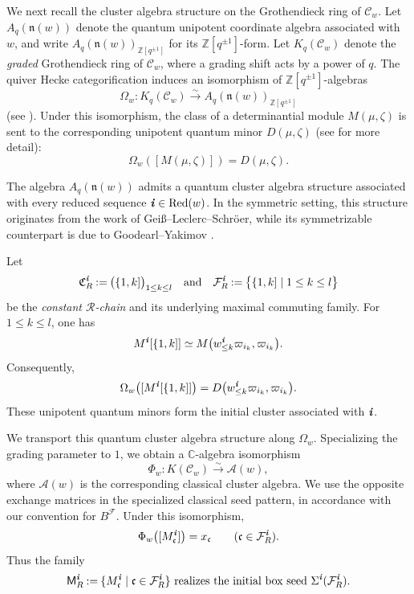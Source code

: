 \documentclass[12pt, leqno]{amsart}
\numberwithin{equation}{section}
\theoremstyle{plain}
\theoremstyle{definition}
\newcommand{\seteq}{\mathbin{:=}}
\newcommand{\C}{\mathbb{C}}
\newcommand{\ii}{ \textbf{\textit{i}}}
\newcommand{\frakC}{\mathfrak{C}}
\newcommand{\frakc}{\mathfrak{c}}
\newcommand{\sfM}{\mathsf{M}}
\newcommand{\calA}{\mathcal{A}}
\newcommand{\calF}{\mathcal{F}}
\newcommand{\calR}{\mathcal{R}}
\newcommand{\scrC}{\mathscr{C}}
\newcommand{\qtq}[1][{and}]{\quad\text{{#1}}\quad}
\newcommand{\Red}{\mathrm{Red}}
\begin{document}
We next recall the cluster algebra structure on the Grothendieck
ring of \(\scrC_w\).
Let \(A_q(\mathfrak n(w))\) denote the quantum unipotent coordinate
algebra associated with \(w\), and write
\(A_q(\mathfrak n(w))_{\mathbb Z[q^{\pm1}]}\) for its
\(\mathbb Z[q^{\pm1}]\)-form.
Let \(K_q(\scrC_w)\) denote the \emph{graded} Grothendieck ring of
\(\scrC_w\), where a grading shift acts by a power of \(q\).
The quiver Hecke categorification induces an isomorphism of
\(\mathbb Z[q^{\pm1}]\)-algebras
\begin{equation}\label{eq: graded Grothendieck ring of Cw}
\Omega_w:
K_q(\scrC_w)
\xrightarrow{\sim}
A_q(\mathfrak n(w))_{\mathbb Z[q^{\pm1}]}
\end{equation}
(see \cite[Theorem~2.20(ii-a)]{KKOP18}).
Under this isomorphism, the class of a
determinantial module \(M(\mu,\zeta)\) is sent to the corresponding unipotent quantum minor
\(D(\mu,\zeta)\) (see \cite[Proposition~4.1]{KKOP18} for more detail):
\[
\Omega_w([M(\mu,\zeta)])=D(\mu,\zeta).
\]

The algebra \(A_q(\mathfrak n(w))\) admits a quantum cluster algebra
structure associated with every reduced sequence
\(\ii\in\Red(w)\).  In the symmetric setting, this structure
originates from the work of Geiß--Leclerc--Schröer, while its
symmetrizable counterpart is due to Goodearl--Yakimov \cite{GLS11,GLS13,GY17,GY21}.

Let
\[
\frakC_R^\ii \seteq \bigl(\{1,k]\bigr)_{1\leq k\leq l} 
\qtq
\calF_R^\ii \seteq \bigl\{\{1,k]\mid1\leq k\leq l\bigr\}
\]
be the \emph{constant \(\calR\)-chain} and its underlying maximal commuting
family.  For \(1\leq k\leq l\), one has
\[
M^\ii[\{1,k]] \simeq M\bigl( w_{\leq k}^\ii\varpi_{i_k}, \varpi_{i_k} \bigr).
\]
Consequently,
\[
\Omega_w\bigl([M^\ii[\{1,k]]\bigr)
= 
D\bigl( w_{\leq k}^\ii\varpi_{i_k}, \varpi_{i_k} \bigr).
\]
These unipotent quantum minors form the initial cluster associated with \(\ii\).

We transport this quantum cluster algebra structure along
\(\Omega_w\).  Specializing the grading parameter to \(1\), we
obtain a \(\C\)-algebra isomorphism
\[
\Phi_w:
K(\scrC_w)
\xrightarrow{\sim}
\calA(w),
\]
where \(\calA(w)\) is the corresponding classical cluster algebra.
We use the opposite exchange matrices in the specialized
classical seed pattern, in accordance with our convention for
\(B^\calF\). 
Under this isomorphism,
\begin{equation}\label{eq: constant R categorical seed}
\Phi_w\bigl([M_\frakc^\ii]\bigr)
=
x_\frakc
\qquad
(\frakc\in\calF_R^\ii).
\end{equation}
Thus the family
\[
\sfM_R^\ii
\seteq
\{M_\frakc^\ii\mid\frakc\in\calF_R^\ii\} \text{ realizes the initial box seed $\Sigma^\ii(\calF_R^\ii)$.}
\]
\end{document}
